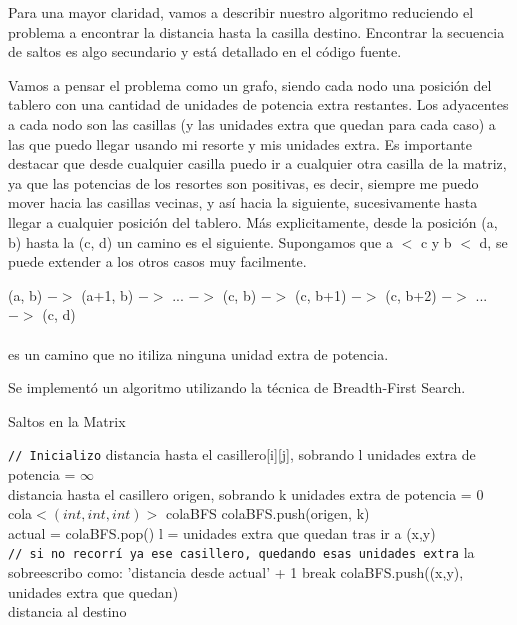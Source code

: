 \documentclass[11pt, a4paper, twoside]{article}
\begin{document}
{}
Para una mayor claridad, vamos a describir nuestro algoritmo reduciendo el problema a encontrar la distancia
hasta la casilla destino. Encontrar la secuencia de saltos es algo secundario y está detallado en el código fuente.

Vamos a pensar el problema como un grafo, siendo cada nodo una posición del tablero con una cantidad de unidades 
de potencia extra restantes. Los adyacentes a cada nodo son las casillas (y las unidades extra que quedan para 
cada caso) a las que puedo llegar usando mi resorte y mis unidades extra. Es importante destacar que desde cualquier casilla puedo ir a cualquier otra casilla de la matriz, ya que las potencias de los resortes son positivas, es decir, siempre me puedo mover hacia las casillas vecinas, y así hacia la siguiente, sucesivamente hasta llegar a cualquier posición del tablero. Más explicitamente, desde la posición (a, b) hasta la (c, d) un camino es el siguiente. Supongamos que a $<$ c y b $<$ d, se puede extender a los otros casos muy facilmente.


(a, b) $->$ (a+1, b) $->$ ... $->$ (c, b) $->$ (c, b+1) $->$ (c, b+2) $->$ ... $->$ (c, d)
\\\\es un camino que no itiliza ninguna unidad extra de potencia. 

Se implementó un algoritmo utilizando la técnica de Breadth-First Search. \\

\begin{algorithm}[H]
\caption{Saltos en la Matrix}\label{alg:ej3-matrix}
\begin{algorithmic}[1]

\Statex \texttt{// Inicializo}
	  
		\State distancia hasta el casillero[i][j], sobrando l unidades extra de potencia = $\infty$
	\EndFor \\

\State distancia hasta el casillero origen, sobrando k unidades extra de potencia = 0 \\
\State cola$<(int, int, int)>$ colaBFS
\State colaBFS.push(origen, k) \\

   
\State actual = colaBFS.pop()
		    \State l = unidades extra que quedan tras ir a (x,y) \\
			\Statex \hspace{1cm} \texttt{// si no recorrí ya ese casillero, quedando esas unidades extra}
				\State   la sobreescribo como: 'distancia desde actual' + 1
					\State break
				\EndIf
				\State colaBFS.push((x,y), unidades extra que quedan)
			\EndIf	
	\EndFor		
\EndWhile
\\
\State \Return distancia al destino

\end{algorithmic}
\end{algorithm}
\end{document}
